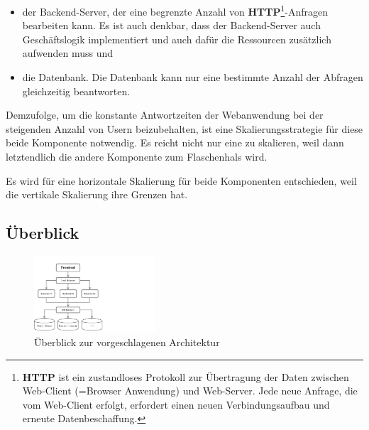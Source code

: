 \begin{itemize}

\item der Backend-Server, der eine begrenzte Anzahl von \textbf{HTTP}\footnote{\textbf{HTTP} ist ein zustandloses Protokoll zur Übertragung der Daten zwischen Web-Client (=Browser Anwendung) und Web-Server. Jede neue Anfrage, die vom Web-Client erfolgt, erfordert einen neuen Verbindungsaufbau und erneute Datenbeschaffung.}-Anfragen bearbeiten kann. Es ist auch denkbar, dass der Backend-Server auch Geschäftslogik implementiert und auch dafür die  Ressourcen zusätzlich aufwenden muss und

\item die Datenbank. Die Datenbank kann nur eine bestimmte Anzahl der Abfragen gleichzeitig beantworten.

\end{itemize}

Demzufolge, um die konstante Antwortzeiten der Webanwendung bei der steigenden Anzahl von Usern beizubehalten, ist eine Skalierungsstrategie für diese beide Komponente notwendig. Es reicht nicht nur eine zu skalieren, weil dann letztendlich die andere Komponente zum Flaschenhals wird.

Es wird für eine horizontale Skalierung für beide Komponenten entschieden, weil die vertikale Skalierung ihre Grenzen hat.

\subsection{Überblick}

\begin{figure}
\begin{center}
\vspace{-20pt}%
\includegraphics[trim = 0mm 0mm 0mm 0mm, clip, width=0.4\textwidth]{resources/ueberblickArchitektur}
\caption[Überblick zur vorgeschlagenen Architektur]{Überblick zur vorgeschlagenen Architektur}
\label{img:ueberblickArchitektur}
\vspace{-30pt}%
\end{center}
\end{figure}

